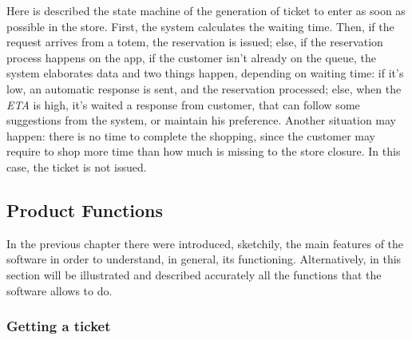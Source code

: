 \documentclass{article}
\begin{document}
		Here is described the state machine of the generation of ticket to enter as soon as possible in the store. First, the system calculates the waiting time. Then, if the request arrives from a totem, the reservation is issued; else, if the reservation process happens on the app, if the customer isn't already on the queue, the system elaborates data and two things happen, depending on waiting time: if it's low, an automatic response is sent, and the reservation processed; else, when the \emph{ETA} is high, it's waited a response from customer, that can follow some suggestions from the system, or maintain his preference. Another situation may happen: there is no time to complete the shopping, since the customer may require to shop more time than how much is missing to the store closure. In this case, the ticket is not issued.

	

	\newpage
	\subsection{Product Functions}
		
	In the previous chapter there were introduced, sketchily, the main features of the software in order to understand, in general, its functioning. Alternatively, in this section will be illustrated and described accurately all the functions that the software allows to do.
	
		\subsubsection{Getting a ticket}
		
\end{document}
